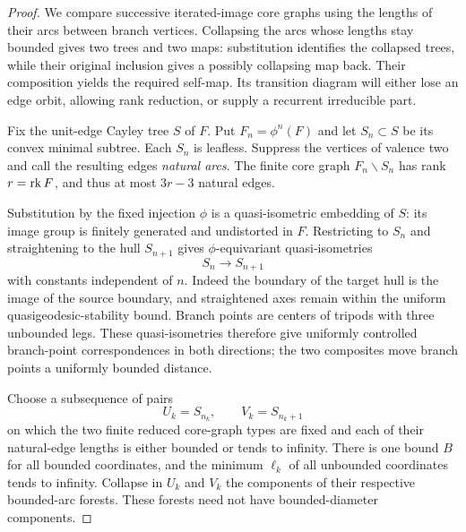 \begin{proof}
We compare successive iterated-image core graphs using the lengths of
their arcs between branch vertices. Collapsing the arcs whose lengths
stay bounded gives two trees and two maps: substitution identifies the
collapsed trees, while their original inclusion gives a possibly
collapsing map back. Their composition yields the required self-map.
Its transition diagram will either lose an edge orbit, allowing rank
reduction, or supply a recurrent irreducible part.

Fix the unit-edge Cayley tree $S$ of $F$. Put $F_n=\phi^n(F)$ and let
$S_n\subset S$ be its convex minimal subtree. Each $S_n$ is leafless.
Suppress the vertices of valence two and call the resulting edges
\emph{natural arcs}. The finite core graph $F_n\backslash S_n$ has rank
$r=\operatorname{rk} F$, and thus at most $3r-3$ natural edges.

Substitution by the fixed injection $\phi$ is a quasi-isometric embedding
of $S$: its image group is finitely generated and undistorted in $F$.
Restricting to $S_n$ and straightening to the hull $S_{n+1}$ gives
$\phi$-equivariant quasi-isometries
\[
 S_n\longrightarrow S_{n+1}
\]
with constants independent of $n$. Indeed the boundary of the target
hull is the image of the source boundary, and straightened axes remain
within the uniform quasigeodesic-stability bound. Branch points are
centers of tripods with three unbounded legs. These quasi-isometries
therefore give uniformly controlled branch-point correspondences in
both directions; the two composites move branch points a uniformly
bounded distance.

Choose a subsequence of pairs
\[
 U_k=S_{n_k},\qquad V_k=S_{n_k+1}
\]
on which the two finite reduced core-graph types are fixed and each of
their natural-edge lengths is either bounded or tends to infinity.
There is one bound $B$ for all bounded coordinates, and the minimum
$\ell_k$ of all unbounded coordinates tends to infinity. Collapse in
$U_k$ and $V_k$ the components of their respective bounded-arc forests.
These forests need not have bounded-diameter components.


\end{proof}

